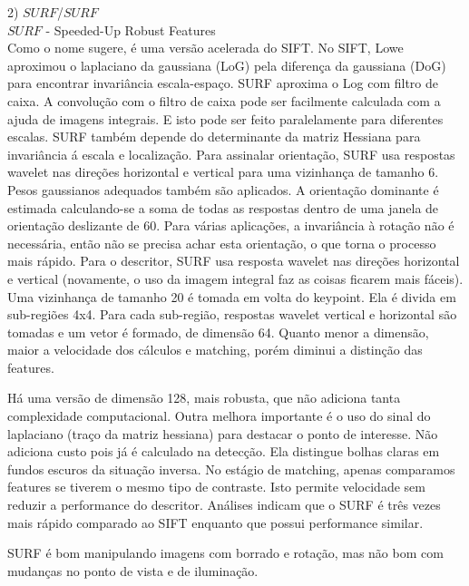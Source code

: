 \documentclass[conference]{IEEEtran}
\begin{document}
	 2) $SURF$/$SURF$			\\
	 $SURF$ - Speeded-Up Robust Features	\\
	 Como o nome sugere, \'e uma vers\~ao acelerada do SIFT. No SIFT, Lowe aproximou o laplaciano da gaussiana (LoG) pela 
	 diferen\c{c}a da gaussiana (DoG) para encontrar invari\^ancia escala-espa\c{c}o. SURF aproxima o Log com filtro de 
	 caixa. A convolu\c{c}\~ao com o filtro de caixa pode ser facilmente calculada com a ajuda de imagens integrais. E isto
	 pode ser feito paralelamente para diferentes escalas. SURF tamb\'em depende do determinante da matriz Hessiana para 
	 invari\^ancia \'a escala e localiza\c{c}\~ao.
	 Para assinalar orienta\c{c}\~ao, SURF usa respostas wavelet nas dire\c{c}\~oes horizontal e vertical para uma 
	 vizinhan\c{c}a de tamanho 6. Pesos gaussianos adequados tamb\'em s\~ao aplicados. A orienta\c{c}\~ao dominante \'e 
	 estimada calculando-se a soma de todas as respostas dentro de uma janela de orienta\c{c}\~ao deslizante de 60\textdegree. Para 
	 v\'arias aplica\c{c}\~oes, a invari\^ancia \`a rota\c{c}\~ao n\~ao \'e necess\'aria, ent\~ao n\~ao se precisa achar 
	 esta orienta\c{c}\~ao, o que torna o processo mais r\'apido.
	 Para o descritor, SURF usa resposta wavelet nas dire\c{c}\~oes horizontal e vertical (novamente, o uso da imagem integral 
	 faz as coisas ficarem mais f\'aceis). Uma vizinhan\c{c}a de tamanho 20 \'e tomada em volta do keypoint. Ela \'e divida 
	 em sub-regi\~oes 4x4. Para cada sub-regi\~ao, respostas wavelet vertical e horizontal s\~ao tomadas e um vetor \'e 
	 formado, de dimens\~ao 64. Quanto menor a dimens\~ao, maior a velocidade dos c\'alculos e matching, por\'em diminui 
	 a distin\c{c}\~ao das features.
	 
	 H\'a uma vers\~ao de dimens\~ao 128, mais robusta, que n\~ao adiciona tanta complexidade computacional. Outra melhora 
	 importante \'e o uso do sinal do laplaciano (tra\c{c}o da matriz hessiana) para destacar o ponto de interesse. N\~ao
	 adiciona custo pois j\'a \'e calculado na detec\c{c}\~ao. Ela distingue bolhas claras em fundos escuros da situa\c{c}\~ao
	 inversa. No est\'agio de matching, apenas comparamos features se tiverem o mesmo tipo de contraste. Isto permite velocidade 
	 sem reduzir a performance do descritor. An\'alises indicam que o SURF \'e tr\^es vezes mais r\'apido comparado ao 
	 SIFT enquanto que possui performance similar.
	 
	 SURF \'e bom manipulando imagens com borrado e rota\c{c}\~ao, mas n\~ao bom com mudan\c{c}as no ponto de vista e de 
	 ilumina\c{c}\~ao. \\
	 
\end{document}
